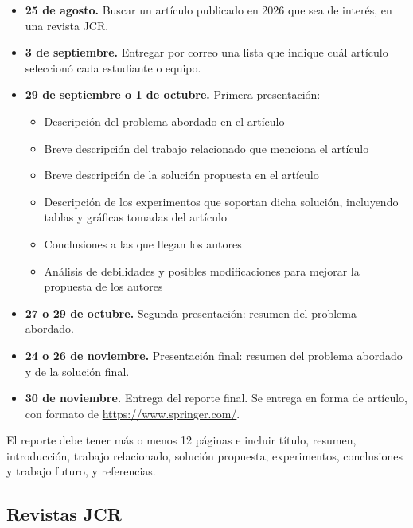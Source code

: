 \documentclass[11pt,letterpaper]{article}
\begin{document}
\begin{itemize}[itemsep=0.4em]
    \item \textbf{25 de agosto.} Buscar un artículo publicado en 2026
          que sea de interés, en una revista JCR.
    \item \textbf{3 de septiembre.} Entregar por correo una lista que
          indique cuál artículo seleccionó cada estudiante o equipo.
    \item \textbf{29 de septiembre o 1 de octubre.} Primera
          presentación:
          \begin{itemize}[itemsep=0.1em]
              \item Descripción del problema abordado en el artículo
              \item Breve descripción del trabajo relacionado que
                    menciona el artículo
              \item Breve descripción de la solución propuesta en el
                    artículo
              \item Descripción de los experimentos que soportan dicha
                    solución, incluyendo tablas y gráficas tomadas del
                    artículo
              \item Conclusiones a las que llegan los autores
              \item Análisis de debilidades y posibles modificaciones
                    para mejorar la propuesta de los autores
          \end{itemize}
    \item \textbf{27 o 29 de octubre.} Segunda presentación: resumen
          del problema abordado.
    \item \textbf{24 o 26 de noviembre.} Presentación final: resumen
          del problema abordado y de la solución final.
    \item \textbf{30 de noviembre.} Entrega del reporte final. Se
          entrega en forma de artículo, con formato de
          \url{https://www.springer.com/}.
\end{itemize}

El reporte debe tener más o menos 12 páginas e incluir título,
resumen, introducción, trabajo relacionado, solución propuesta,
experimentos, conclusiones y trabajo futuro, y referencias.


\subsection*{Revistas JCR}
\end{document}
